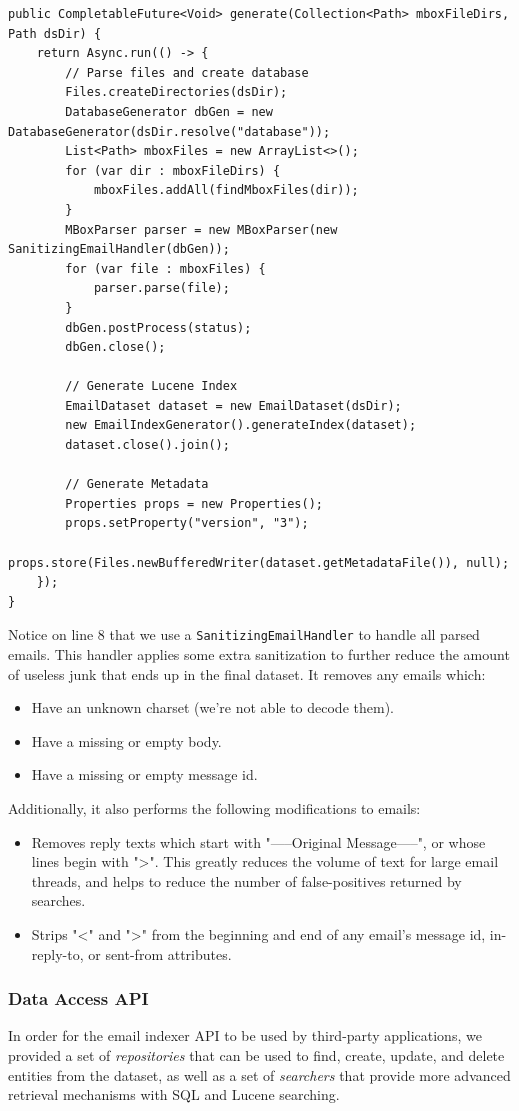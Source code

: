 \documentclass[a4paper, 12pt]{article}
\begin{document}
			\begin{verbatim}
public CompletableFuture<Void> generate(Collection<Path> mboxFileDirs, Path dsDir) {
	return Async.run(() -> {
		// Parse files and create database
		Files.createDirectories(dsDir);
		DatabaseGenerator dbGen = new DatabaseGenerator(dsDir.resolve("database"));
		List<Path> mboxFiles = new ArrayList<>();
		for (var dir : mboxFileDirs) {
			mboxFiles.addAll(findMboxFiles(dir));
		}
		MBoxParser parser = new MBoxParser(new SanitizingEmailHandler(dbGen));
		for (var file : mboxFiles) {
			parser.parse(file);
		}
		dbGen.postProcess(status);
		dbGen.close();
		
		// Generate Lucene Index
		EmailDataset dataset = new EmailDataset(dsDir);
		new EmailIndexGenerator().generateIndex(dataset);
		dataset.close().join();
		
		// Generate Metadata
		Properties props = new Properties();
		props.setProperty("version", "3");
		props.store(Files.newBufferedWriter(dataset.getMetadataFile()), null);
	});
}
			\end{verbatim}
			
			Notice on line 8 that we use a \texttt{SanitizingEmailHandler} to handle all parsed emails. This handler applies some extra sanitization to further reduce the amount of useless junk that ends up in the final dataset. It removes any emails which:
			\begin{itemize}
				\item Have an unknown charset (we're not able to decode them).
				\item Have a missing or empty body.
				\item Have a missing or empty message id.
			\end{itemize}
			Additionally, it also performs the following modifications to emails:
			\begin{itemize}
				\item Removes reply texts which start with "-----Original Message-----", or whose lines begin with ">". This greatly reduces the volume of text for large email threads, and helps to reduce the number of false-positives returned by searches.
				\item Strips "<" and ">" from the beginning and end of any email's message id, in-reply-to, or sent-from attributes.
			\end{itemize}
		
		\newpage %
		\subsubsection{Data Access API}
			In order for the email indexer API to be used by third-party applications, we provided a set of \textit{repositories} that can be used to find, create, update, and delete entities from the dataset, as well as a set of \textit{searchers} that provide more advanced retrieval mechanisms with SQL and Lucene searching.
			
\end{document}
